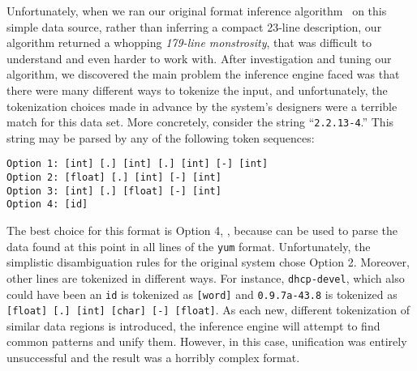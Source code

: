 Unfortunately, when we ran our original format
inference algorithm~\cite{fisher+:dirttoshovels}
on this simple data source, rather than inferring a compact 23-line
description, our algorithm returned a whopping {\em 179-line monstrosity},
that was difficult to understand and even harder to work with.
After investigation and tuning our algorithm,
we discovered the main problem the inference engine faced was that there were
many different ways to tokenize the input, and unfortunately, 
the tokenization choices
made in advance by the system's designers were a terrible match 
for this data set.  More concretely, consider 
the string ``{\tt 2.2.13-4}.'' This string may be parsed by 
any of the following token sequences: {\small
\begin{verbatim}
Option 1: [int] [.] [int] [.] [int] [-] [int]
Option 2: [float] [.] [int] [-] [int]
Option 3: [int] [.] [float] [-] [int]
Option 4: [id]
\end{verbatim}
}\normalsize
The best choice for this format is Option 4, ,
because  can be used to parse the data found at this point in
all lines of the {\tt yum} format.  Unfortunately, the simplistic 
disambiguation rules for the original system chose Option 2.  Moreover,
other lines are tokenized in different ways.
For instance, {\tt dhcp-devel}, which also could have been an {\tt id}
is tokenized as {\tt [word]} and 
{\tt 0.9.7a-43.8} is tokenized as
{\tt [float] [.] [int] [char] [-] [float]}.  As each new, different
tokenization of similar data regions is introduced, the inference
engine will attempt to find common patterns and unify them.  However,
in this case, unification was entirely unsuccessful and the
result was a horribly complex format.
  


